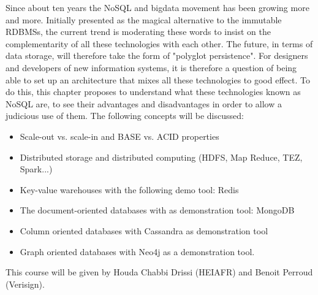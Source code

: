 Since about ten years the NoSQL and bigdata movement has been growing more and more. Initially presented as the magical alternative to the immutable RDBMSs, the current trend is moderating these words to insist on the complementarity of all these technologies with each other. The future, in terms of data storage, will therefore take the form of "polyglot persistence". For designers and developers of new information systems, it is therefore a question of being able to set up an architecture that mixes all these technologies to good effect. To do this, this chapter proposes to understand what these technologies known as NoSQL are, to see their advantages and disadvantages in order to allow a judicious use of them. The following concepts will be discussed:
\begin{itemize}
    \item Scale-out vs. scale-in and BASE vs. ACID properties
    \item Distributed storage and distributed computing (HDFS, Map Reduce, TEZ, Spark...)
    \item Key-value warehouses with the following demo tool: Redis
    \item The document-oriented databases with as demonstration tool: MongoDB
    \item Column oriented databases with Cassandra as demonstration tool
    \item Graph oriented databases with Neo4j as a demonstration tool.
\end{itemize}
This course will be given by Houda Chabbi Drissi (HEIAFR) and Benoit Perroud (Verisign).